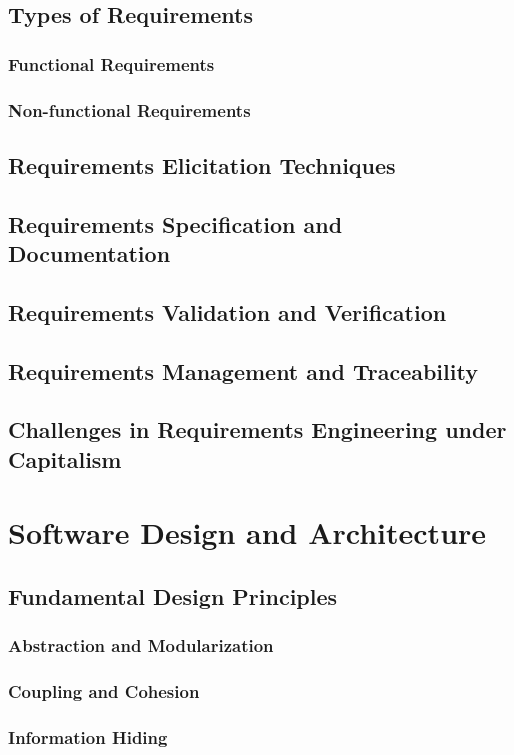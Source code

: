 \begin{refsection}
\subsection{Types of Requirements}
\subsubsection{Functional Requirements}
\subsubsection{Non-functional Requirements}
\subsection{Requirements Elicitation Techniques}
\subsection{Requirements Specification and Documentation}
\subsection{Requirements Validation and Verification}
\subsection{Requirements Management and Traceability}
\subsection{Challenges in Requirements Engineering under Capitalism}

\newpage

\section{Software Design and Architecture}
\subsection{Fundamental Design Principles}
\subsubsection{Abstraction and Modularization}
\subsubsection{Coupling and Cohesion}
\subsubsection{Information Hiding}

\end{refsection}
